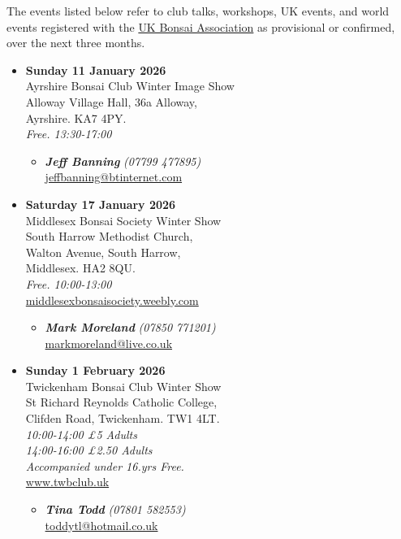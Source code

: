 \label{2025-11-events}

The events listed below refer to club talks, workshops, UK events, and world events registered with the \href{https://www.ukbonsaiassoc.org/events.html}{UK Bonsai Association} as provisional or confirmed, over the next three months.
\begin{itemize}

    \item \textbf{Sunday 11 January 2026}
    \\
    Ayrshire Bonsai Club Winter Image Show \\
    Alloway Village Hall, 36a Alloway, \\
    Ayrshire. KA7 4PY.
    \\
    \emph{Free. 13:30-17:00}
    \begin{itemize}
        \item \textbf{\emph{Jeff Banning}} \emph{(07799 477895)} \\
        \href{mailto:jeffbanning@btinternet.com}{jeffbanning@btinternet.com}
    \end{itemize}

    \item \textbf{Saturday 17 January 2026}
    \\
    Middlesex Bonsai Society Winter Show \\
    South Harrow Methodist Church, \\
    Walton Avenue, South Harrow, \\
    Middlesex. HA2 8QU.
    \\
    \emph{Free. 10:00-13:00}
    \\
    \href{https://middlesexbonsaisociety.weebly.com/}{middlesexbonsaisociety.weebly.com}
    \begin{itemize}
        \item \textbf{\emph{Mark Moreland}} \emph{(07850 771201)} \\
        \href{mailto:markmoreland@live.co.uk}{markmoreland@live.co.uk}
    \end{itemize}

    \item \textbf{Sunday 1 February 2026}
    \\
    Twickenham Bonsai Club Winter Show \\
    St Richard Reynolds Catholic College, \\
    Clifden Road, Twickenham. TW1 4LT.
    \\
    \emph{10:00-14:00 £5 Adults} \\
    \emph{14:00-16:00 £2.50 Adults} \\
    \emph{Accompanied under 16.yrs Free.}
    \\
    \href{https://www.twbclub.uk}{www.twbclub.uk}
    \begin{itemize}
        \item \textbf{\emph{Tina Todd}} \emph{(07801 582553)} \\
        \href{mailto:toddytl@hotmail.co.uk}{toddytl@hotmail.co.uk}
    \end{itemize}


\end{itemize}

